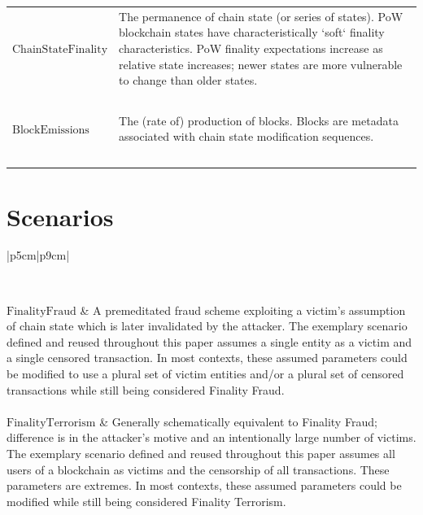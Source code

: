 \documentclass[11pt]{article}
\theoremstyle{plain}
\begin{document}
\begin{table}[H]
{\begin{tabular}{|p{5cm}|p{9cm}|}
$\mathrm{Chain State Finality}$ & The permanence of chain state (or series of
states). PoW blockchain states have characteristically `soft` finality
characteristics. PoW finality expectations increase as relative state
increases; newer states are more vulnerable to change than older states. \\~\\

$\mathrm{Block Emissions}$ & The (rate of) production of blocks. Blocks are
metadata associated with chain state modification sequences. \\~\\

\hline
\end{tabular}
}
\end{table}



\section{\normalsize{Scenarios}}

\begin{table}[H]
\caption{Outlines of Referenced Chain State Scenarios \label{table: model
objects}}
\centering
\small{
\begin{tabular}{|p{5cm}|p{9cm}|}

\hline
{} \\
\hline
\hline

$\mathrm{Finality Fraud}$ & A premeditated fraud scheme exploiting a victim's
assumption of chain state which is later invalidated by the attacker. The
exemplary scenario defined and reused throughout this paper assumes a single
entity as a victim and a single censored transaction. In most contexts, these
assumed parameters could be modified to use a plural set of victim entities
and/or a plural set of censored transactions while still being considered
Finality Fraud. \\~\\

$\mathrm{Finality Terrorism}$ & Generally schematically equivalent to Finality
Fraud; difference is in the attacker's motive and an intentionally large number
of victims. The exemplary scenario defined and reused throughout this paper
assumes all users of a blockchain as victims and the censorship of all
transactions. These parameters are extremes. In most contexts, these assumed
parameters could be modified while still being considered Finality Terrorism.
\\~\\

\hline
\end{tabular}
}
\end{table}
\end{document}

